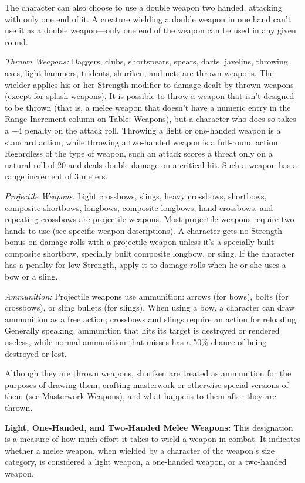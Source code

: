 The character can also choose to use a double weapon two handed, attacking with only one end of it. A creature wielding a double weapon in one hand can't use it as a double weapon---only one end of the weapon can be used in any given round.

\textit{Thrown Weapons:} Daggers, clubs, shortspears, spears, darts, javelins, throwing axes, light hammers, tridents, shuriken, and nets are thrown weapons. The wielder applies his or her Strength modifier to damage dealt by thrown weapons (except for splash weapons). It is possible to throw a weapon that isn't designed to be thrown (that is, a melee weapon that doesn't have a numeric entry in the Range Increment column on Table: Weapons), but a character who does so takes a $-4$ penalty on the attack roll. Throwing a light or one-handed weapon is a standard action, while throwing a two-handed weapon is a full-round action. Regardless of the type of weapon, such an attack scores a threat only on a natural roll of 20 and deals double damage on a critical hit. Such a weapon has a range increment of 3 meters.

\textit{Projectile Weapons:} Light crossbows, slings, heavy crossbows, shortbows, composite shortbows, longbows, composite longbows, hand crossbows, and repeating crossbows are projectile weapons. Most projectile weapons require two hands to use (see specific weapon descriptions). A character gets no Strength bonus on damage rolls with a projectile weapon unless it's a specially built composite shortbow, specially built composite longbow, or sling. If the character has a penalty for low Strength, apply it to damage rolls when he or she uses a bow or a sling.

\textit{Ammunition:} Projectile weapons use ammunition: arrows (for bows), bolts (for crossbows), or sling bullets (for slings). When using a bow, a character can draw ammunition as a free action; crossbows and slings require an action for reloading. Generally speaking, ammunition that hits its target is destroyed or rendered useless, while normal ammunition that misses has a 50\% chance of being destroyed or lost.

Although they are thrown weapons, shuriken are treated as ammunition for the purposes of drawing them, crafting masterwork or otherwise special versions of them (see Masterwork Weapons), and what happens to them after they are thrown.

\textbf{Light, One-Handed, and Two-Handed Melee Weapons:} This designation is a measure of how much effort it takes to wield a weapon in combat. It indicates whether a melee weapon, when wielded by a character of the weapon's size category, is considered a light weapon, a one-handed weapon, or a two-handed weapon.

